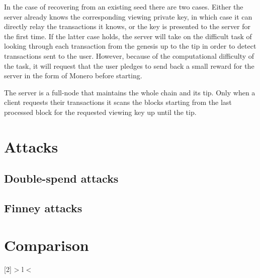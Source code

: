 \documentclass[sigconf]{acmart}
\begin{document}
In the case of recovering from an existing seed there are two cases. Either the server already knows the corresponding viewing private key, in which case it can directly relay the transactions it knows, or the key is presented to the server for the first time. If the latter case holds, the server will take on the difficult task of looking through each transaction from the genesis up to the tip in order to detect transactions sent to the user. However, because of the computational difficulty of the task, it will request that the user pledges to send back a small reward for the server in the form of Monero before starting.

The server is a full-node that maintains the whole chain and its tip. Only when a client requests their transactions it scans the blocks starting from the last processed block for the requested viewing key up until the tip.

\section{Attacks}
\subsection{Double-spend attacks}
\subsection{Finney attacks}

\section{Comparison}
\newcolumntype{R}[2]{%
    >{\bgroup}%
    l%
    <{\egroup}%
}
\newcommand*\rot{\multicolumn{1}{R{45}{1em}}}%

\def\half{\char9680}
\def\full{\char9679}
\end{document}
